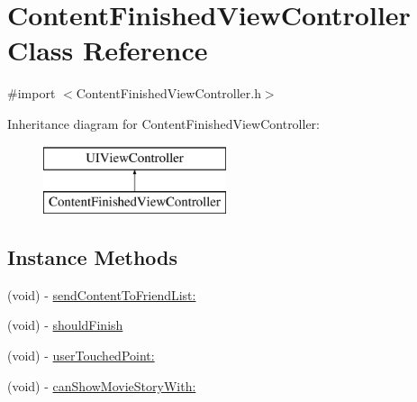 \hypertarget{interface_content_finished_view_controller}{}\section{Content\+Finished\+View\+Controller Class Reference}
\label{interface_content_finished_view_controller}


{\ttfamily \#import $<$Content\+Finished\+View\+Controller.\+h$>$}

Inheritance diagram for Content\+Finished\+View\+Controller\+:\begin{figure}[H]
\begin{center}
\leavevmode
\includegraphics[height=2.000000cm]{interface_content_finished_view_controller}
\end{center}
\end{figure}
\subsection*{Instance Methods}
\begin{DoxyCompactItemize}
\item 
(void) -\/ \hyperlink{interface_content_finished_view_controller_a4e3410e5ff6a0796e56c81b12acd6efe}{send\+Content\+To\+Friend\+List\+:}
\item 
(void) -\/ \hyperlink{interface_content_finished_view_controller_af3f633e37ed5677097546a2ab932bfba}{should\+Finish}
\item 
(void) -\/ \hyperlink{interface_content_finished_view_controller_a96dba879bc00d3b739d885d55e3ad44f}{user\+Touched\+Point\+:}
\item 
(void) -\/ \hyperlink{interface_content_finished_view_controller_a16b1e6c99452a56b19f06b00a5e80fd5}{can\+Show\+Movie\+Story\+With\+:}
\end{DoxyCompactItemize}
